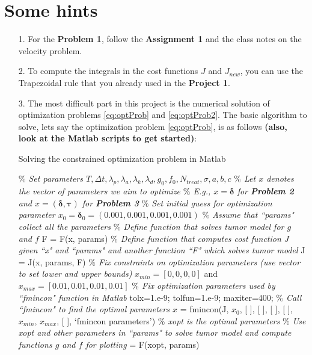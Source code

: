 \documentclass[11pt,a4paper]{article}
\newcommand{\bolds}[1]{\boldsymbol{#1}}
\begin{document}
\section{Some hints}
\begin{itemize}
\item[1.] For the \textbf{Problem 1}, follow the \textbf{Assignment 1} and the class notes on the velocity problem. 

\item[2.] To compute the integrals in the cost functions $J$ and $J_{new}$, you can use the Trapezoidal rule that you already used in the \textbf{Project 1}. 

\item[3.] The most difficult part in this project is the numerical solution of optimization problems \eqref{eq:optProb} and \eqref{eq:optProb2}. The basic algorithm to solve, lets say the optimization problem \eqref{eq:optProb}, is as follows \textbf{(also, look at the Matlab scripts to get started)}:

\begin{algorithm}[h]
	\caption{Solving the constrained optimization problem in Matlab}
	\label{alg:optProb}
	\begin{algorithmic}[1]
	    \STATE \textcolor{mygray}{\it $\%$ Set parameters $T, \Delta t, \lambda_p, \lambda_a, \lambda_k, \lambda_d, g_0, f_0, N_{treat}, \sigma, a, b, c$}
		\STATE \textcolor{mygray}{\it $\%$ Let $x$ denotes the vector of parameters we aim to optimize}
		\STATE \textcolor{mygray}{\it $\%$ E.g., $x = \bolds{\delta}$ for \textbf{Problem 2} and $x = (\bolds{\delta}, \bolds{\tau})$ for \textbf{Problem 3}}
		\STATE \textcolor{mygray}{\it $\%$ Set initial guess for optimization parameter $x_0 = \bolds{\delta}_0 = (0.001, 0.001, 0.001, 0.001)$}
		\STATE \textcolor{mygray}{\it $\%$ Assume that ``params" collect all the parameters}
		\STATE \textcolor{mygray}{\it $\%$ Define function that solves tumor model for $g$ and $f$}
		\STATE F = F(x, params)
		\STATE \textcolor{mygray}{\it $\%$ Define function that computes cost function $J$ given ``x" and ``params" and another function ``F" which solves tumor model}
		\STATE J = J(x, params, F)
		\STATE \textcolor{mygray}{\it $\%$ Fix constraints on optimization parameters (use vector to set lower and upper bounds)}
		\STATE $x_{min} = [0, 0, 0, 0]$ and $x_{max} = [0.01, 0.01, 0.01, 0.01]$
		\STATE \textcolor{mygray}{\it $\%$ Fix optimization parameters used by ``fmincon" function in Matlab}
		\STATE tolx=1.e-9;  tolfun=1.e-9;  maxiter=400;
		\STATE \textcolor{mygray}{\it $\%$ Call ``fmincon" to find the optimal parameters $x$}
		 = fmincon(J, $x_0$, [ ], [ ], [ ], [ ], $x_{min}$, $x_{max}$, [ ], `fmincon parameters')
		\STATE \textcolor{mygray}{\it $\%$ xopt is the optimal parameters}
		\STATE \textcolor{mygray}{\it $\%$ Use xopt and other parameters in ``params" to solve tumor model and compute functions $g$ and $f$ for plotting}
		 = F(xopt, params)
	\end{algorithmic}
\end{algorithm}

\end{itemize} 
\end{document}
